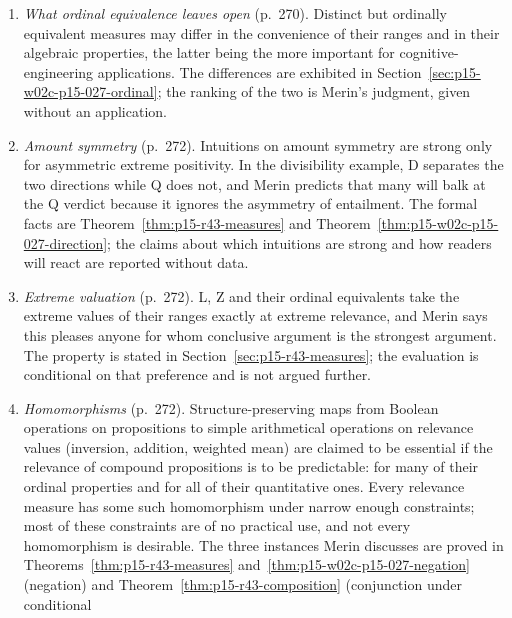 \begin{enumerate}
  a methodological claim whose investigation the chapter does not carry
  out in general; and that Merin mostly keeps the format
  \(R(E\Yright H)\) for cross-reference to the confirmation literature,
  as \(A\) and \(B\) serve the content-neutral mathematical literature
  (p.~269), a choice of presentation. Both are discussed after the
  four steps in Section~\ref{sec:p15-w02c-p15-027-direction}.
\item \emph{What ordinal equivalence leaves open} (p.~270). Distinct but
  ordinally equivalent measures may differ in the convenience of their
  ranges and in their algebraic properties, the latter being the more
  important for cognitive-engineering applications. The differences are
  exhibited in Section~\ref{sec:p15-w02c-p15-027-ordinal}; the ranking of
  the two is Merin's judgment, given without an application.
\item \emph{Amount symmetry} (p.~272). Intuitions on amount symmetry
  are strong only for asymmetric extreme positivity. In the
  divisibility example, D separates the two directions while Q does
  not, and Merin predicts that many will balk at the Q verdict because
  it ignores the asymmetry of entailment. The formal facts are
  Theorem~\ref{thm:p15-r43-measures} and
  Theorem~\ref{thm:p15-w02c-p15-027-direction}; the claims about which
  intuitions are strong and how readers will react are reported without
  data.
\item \emph{Extreme valuation} (p.~272). L, Z and their ordinal
  equivalents take the extreme values of their ranges exactly at
  extreme relevance, and Merin says this pleases anyone for whom
  conclusive argument is the strongest argument. The property is stated
  in Section~\ref{sec:p15-r43-measures}; the evaluation is conditional
  on that preference and is not argued further.
\item \emph{Homomorphisms} (p.~272). Structure-preserving maps from
  Boolean operations on propositions to simple arithmetical operations on
  relevance values (inversion, addition, weighted mean) are claimed to be
  essential if the relevance of compound propositions is to be
  predictable: for many of their ordinal properties and for all of their
  quantitative ones. Every relevance measure
  has some such homomorphism under narrow enough constraints; most of
  these constraints are of no practical use, and not every homomorphism
  is desirable. The three instances Merin discusses are proved in
  Theorems~\ref{thm:p15-r43-measures}
  and~\ref{thm:p15-w02c-p15-027-negation} (negation) and
  Theorem~\ref{thm:p15-r43-composition} (conjunction under conditional

\end{enumerate}

